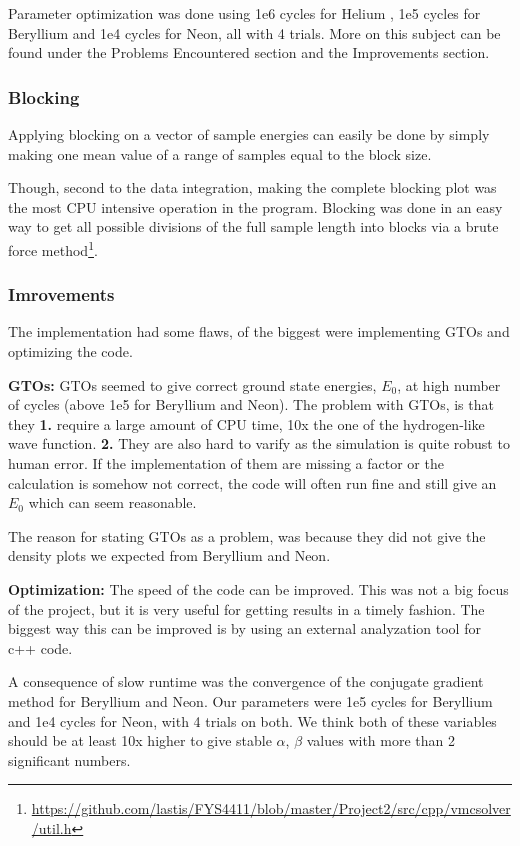 \documentclass[twocolumn,fleqn,8pt]{article}  %
\begin{document}
Parameter optimization was done using 1e6 cycles for Helium , 
1e5 cycles for Beryllium and 1e4 cycles for Neon, all with 4 trials. More on this
subject can be found under the Problems Encountered section and the Improvements section.

\subsubsection{Blocking}
Applying blocking on a vector of sample energies can easily be done by simply making
one mean value of a range of samples equal to the block size. 

Though, second to the data integration, making the complete blocking plot was the 
most CPU intensive operation in the program.
Blocking was done in an easy way to get all possible divisions of the full sample length
into blocks via a brute force method\footnote{\url{https://github.com/lastis/FYS4411/blob/master/Project2/src/cpp/vmcsolver/util.h}}.

\subsubsection{Imrovements}
The implementation had some flaws, of the biggest were implementing GTOs and optimizing the
code. 

{\bf GTOs:} GTOs seemed to give correct ground state energies, $E_0$, at high number of cycles
(above 1e5 for Beryllium and Neon). The problem with GTOs, is that they 
{\color{MediumBlue}\bf1.} require a large amount
of CPU time, 10x the one of the hydrogen-like wave function. {\color{MediumBlue}\bf2.}
They are also hard to varify as the simulation is quite robust to human error. If 
the implementation of them are missing a factor or the calculation is somehow not
correct, the code will often run fine and still give an $E_0$ which can seem reasonable. 

The reason for stating GTOs as a problem, was because they did not give the
density plots we expected from Beryllium and Neon.

{\bf Optimization:}
The speed of the code can be improved. This was not a big focus of the project, but
it is very useful for getting results in a timely fashion. The biggest way this
can be improved is by using an external analyzation tool for c++ code. 

A consequence of slow runtime was the convergence of 
the conjugate gradient method for Beryllium and Neon. 
Our parameters were 1e5 cycles for Beryllium and 1e4 cycles for Neon, with 4 trials
on both. We think both of these variables should be at least 10x higher to give
stable $\alpha$, $\beta$ values with more than 2 significant numbers.
\end{document}

